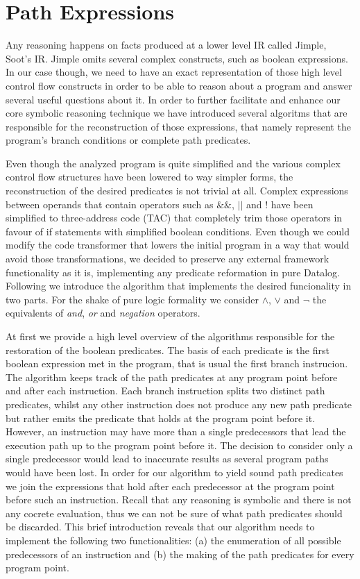 \section{Path Expressions}

Any \doop{} reasoning happens on facts produced at a lower level IR
called Jimple, Soot's IR. Jimple omits several complex constructs,
such as boolean expressions. In our case though, we need to have an exact
representation of those high level control flow constructs in order to be
able to reason about a program and answer several useful questions about
it. In order to further facilitate and enhance our core symbolic reasoning
technique we have introduced several algoritms that are responsible for the
reconstruction of those expressions, that namely represent the program's branch
conditions or complete path predicates.


Even though the analyzed program is quite simplified and the various complex
control flow structures have been lowered to way simpler forms, the reconstruction
of the desired predicates is not trivial at all. Complex expressions between operands
that contain operators such as $\&\&$, $||$ and $!$ have been simplified
to three-address code (TAC) that completely trim those operators in favour of
if statements with simplified boolean conditions. Even though we could modify
the code transformer that lowers the initial program in a way that would avoid those
transformations, we decided to preserve any external framework functionality as
it is, implementing any predicate reformation in pure Datalog. Following
we introduce the algorithm that implements the desired funcionality in two parts.
For the shake of pure logic formality we consider $\land$, $\lor$ and $\neg$ the equivalents of
\emph{and}, \emph{or} and \emph{negation} operators.

At first we provide a high level overview of the algorithms responsible
for the restoration of the boolean predicates. The basis of each predicate is
the first boolean expression met in the program, that is usual the first
branch instrucion. The algorithm keeps track of the path predicates at any
program point before and after each instruction. Each branch instruction splits
two distinct path predicates, whilst any other instruction does not produce
any new path predicate but rather emits the predicate that holds at the program
point before it. However, an instruction may have more than
a single predecessors that lead the execution path
up to the program point before it. The decision to consider only a single predecessor
would lead to inaccurate results as several program paths would have been lost. In
order for our algorithm to yield sound path predicates we join the
expressions that hold after each predecessor at the program point before such an
instruction. Recall that any reasoning is symbolic and there is not any cocrete
evaluation, thus we can not be sure of what path predicates should be discarded.
This brief introduction reveals that our algorithm needs to implement
the following two functionalities: (a) the enumeration of all possible predecessors
of an instruction and (b) the making of the path predicates for every program
point.

